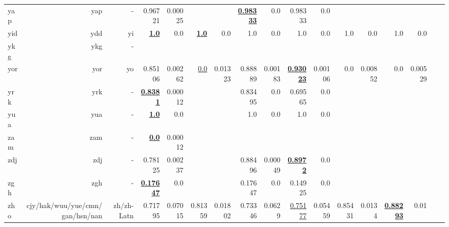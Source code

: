 \documentclass[11pt]{article}
\begin{document}
\begin{table*}[h]
{\begin{tabular}{lrrrrrrrrrrrrrrrr}
yap         & yap         & -         & 0.96721         & 0.00025         &          &          & \textbf{\underline{0.98333}}         & 0.0         & 0.98333         & 0.0         &          &          &          &          \\
yid         & ydd         & yi         & \textbf{\underline{1.0}}         & 0.0         & \textbf{\underline{1.0}}         & 0.0         & 1.0         & 0.0         & 1.0         & 0.0         & 1.0         & 0.0         & 1.0         & 0.0         \\
ykg         & ykg         & -         &          &          &          &          &          &          &          &          &          &          &          &          \\
yor         & yor         & yo         & 0.85106         & 0.00262         & \underline{0.0}         & 0.01323         & 0.88889         & 0.00183         & \textbf{\underline{0.93023}}         & 0.00106         & 0.0         & 0.00852         & 0.0         & 0.00529         \\
yrk         & yrk         & -         & \textbf{\underline{0.8381}}         & 0.00012         &          &          & 0.83495         & 0.0         & 0.69565         & 0.0         &          &          &          &          \\
yua         & yua         & -         & \textbf{\underline{1.0}}         & 0.0         &          &          & 1.0         & 0.0         & 1.0         & 0.0         &          &          &          &          \\
zam         & zam         & -         & \textbf{\underline{0.0}}         & 0.00012         &          &          &          &          &          &          &          &          &          &          \\
zdj         & zdj         & -         & 0.78125         & 0.00237         &          &          & 0.88496         & 0.00049         & \textbf{\underline{0.8972}}         & 0.0         &          &          &          &          \\
zgh         & zgh         & -         & \textbf{\underline{0.17647}}         & 0.0         &          &          & 0.17647         & 0.0         & 0.14925         & 0.0         &          &          &          &          \\
zho         & cjy/hak/wuu/yue/cmn/gan/hsn/nan         & zh/zh-Latn         & 0.71795         & 0.07015         & 0.81359         & 0.01802         & 0.73346         & 0.0629         & \underline{0.75177}         & 0.05459         & 0.85431         & 0.0134         & \textbf{\underline{0.88293}}         & 0.01         \\

\end{tabular}}
\end{table*}
\end{document}
